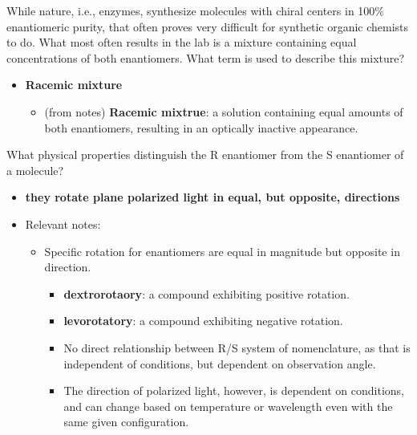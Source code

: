 \documentclass[12pt,a4paper]{article}
\begin{document}
\begin{enumerate}
\begin{itemize}
\begin{itemize}
            \end{itemize}
        \end{itemize}
    {\color{G-Moon}\item While nature, i.e., enzymes, synthesize molecules with chiral centers in 100\% enantiomeric purity, that often proves very difficult for synthetic organic chemists to do.  What most often results in the lab is a mixture containing equal concentrations of both enantiomers. What term is used to describe this mixture?}
        \begin{itemize}
            \item {\color{o-Sun}\textbf{Racemic mixture}} 
            \begin{itemize}
                \item (from notes) \textbf{Racemic mixtrue}: a solution containing equal amounts of both enantiomers, resulting in an optically inactive appearance.
            \end{itemize}
        \end{itemize}
    {\color{G-Moon}\item What physical properties distinguish the R enantiomer from the S enantiomer of a molecule?}
        \begin{itemize}
            \item {\color{o-Sun}\textbf{they rotate plane polarized light in equal, but opposite, directions}} 
            \item Relevant notes:
                \begin{itemize}
                    \item Specific rotation for enantiomers are {\color{o-Sun}equal in magnitude} but {\color{o-Sun}opposite in direction}.
                        \begin{itemize}
                            \item {\color{pos}\textbf{dextrorotaory}}: a compound exhibiting {\color{pos}positive} rotation.
                            \item {\color{neg}\textbf{levorotatory}}: a compound exhibiting {\color{neg}negative} rotation.
                            \item No direct relationship between R/S system of nomenclature, as that is independent of conditions, but dependent on observation angle.
                            \item The {\color{o-Sun}direction} of polarized light, however, is {\color{o-Sun}dependent on conditions}, and can change based on temperature or wavelength even with the same given configuration.
                        \end{itemize}
                \end{itemize}
        \end{itemize}
\end{enumerate}
\end{document}
